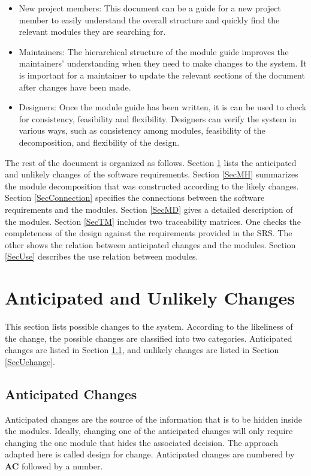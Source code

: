\documentclass[12pt]{article}
\begin{document}
\begin{itemize}
\item New project members: This document can be a guide for a new project member
  to easily understand the overall structure and quickly find the
  relevant modules they are searching for.
\item Maintainers: The hierarchical structure of the module guide improves the
  maintainers' understanding when they need to make changes to the system. It is
  important for a maintainer to update the relevant sections of the document
  after changes have been made.
\item Designers: Once the module guide has been written, it is can be used to
  check for consistency, feasibility and flexibility. Designers can verify the
  system in various ways, such as consistency among modules, feasibility of the
  decomposition, and flexibility of the design.
\end{itemize}

The rest of the document is organized as follows. Section
\ref{SecChange} lists the anticipated and unlikely changes of the software
requirements. Section \ref{SecMH} summarizes the module decomposition that
was constructed according to the likely changes. Section \ref{SecConnection}
specifies the connections between the software requirements and the
modules. Section \ref{SecMD} gives a detailed description of the
modules. Section \ref{SecTM} includes two traceability matrices. One checks
the completeness of the design against the requirements provided in the SRS. The
other shows the relation between anticipated changes and the modules. Section
\ref{SecUse} describes the use relation between modules.

\section{Anticipated and Unlikely Changes} \label{SecChange}

This section lists possible changes to the system. According to the likeliness
of the change, the possible changes are classified into two
categories. Anticipated changes are listed in Section \ref{SecAchange}, and
unlikely changes are listed in Section \ref{SecUchange}.

\subsection{Anticipated Changes} \label{SecAchange}

Anticipated changes are the source of the information that is to be hidden
inside the modules. Ideally, changing one of the anticipated changes will only
require changing the one module that hides the associated decision. The approach
adapted here is called design for
change. Anticipated changes are numbered by \textbf{AC} followed by a number.
\end{document}
